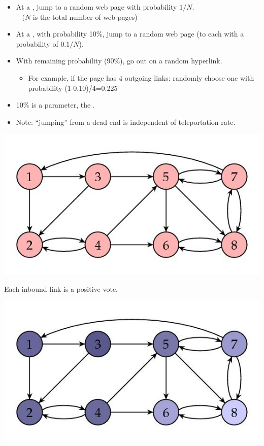 \documentclass[a4paper,landscape,headrule,footrule,xetex]{foils}
\begin{document}
\begin{itemize}
\item At a , jump to a random web page with
  probability $1/N$.
\\ ~   \hfill ($N$ is the total number of web pages)
\item At a , with probability 10\%, jump to a
  random web page (to each with a probability of $0.1/N$).
\item With remaining probability (90\%), go out on a random
  hyperlink.
\begin{itemize}
 \item For example, if the page has 4 outgoing links:
   randomly choose one with probability (1-0.10)/4=0.225
\end{itemize}
\item 10\% is a parameter, the .
\item Note: ``jumping'' from a dead end is
independent of teleportation rate.
\end{itemize}

\begin{center}
\includegraphics[height=0.8\textheight]{../pics/goodnet.jpg}  
\end{center}
Each inbound link is a positive vote.


\begin{center}
\includegraphics[height=0.8\textheight]{../pics/goodnet-shaded.jpg}  
\end{center}
\end{document}
